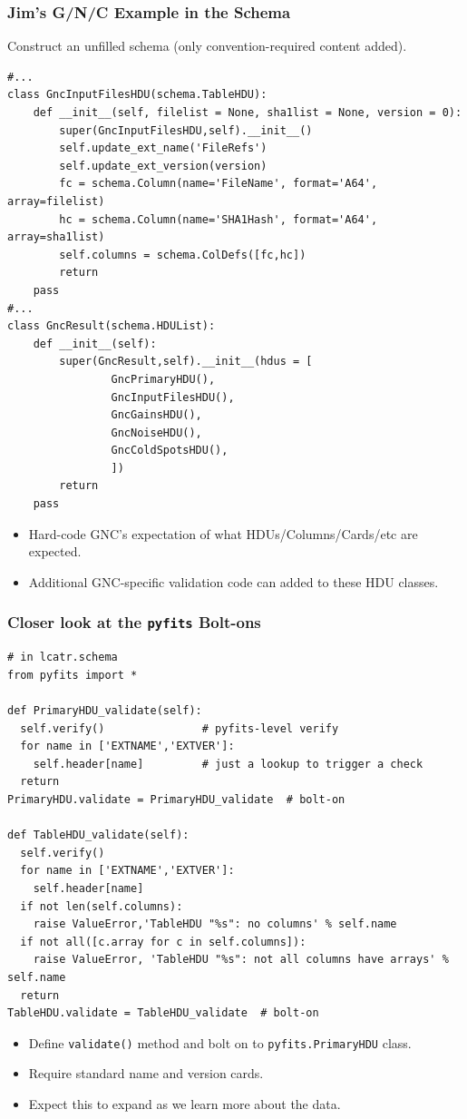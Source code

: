\documentclass[xcolor=dvipsnames]{beamer}
\begin{document}
\begin{frame}[fragile]
  \frametitle{Jim's G/N/C Example in the Schema}

  Construct an unfilled schema (only convention-required content added).

  \begin{lstlisting}[emph={GncInputFilesHDU,GncResult,schema,TableHDU,Column}]
#...
class GncInputFilesHDU(schema.TableHDU):
    def __init__(self, filelist = None, sha1list = None, version = 0):
        super(GncInputFilesHDU,self).__init__()
        self.update_ext_name('FileRefs')
        self.update_ext_version(version)
        fc = schema.Column(name='FileName', format='A64', array=filelist)
        hc = schema.Column(name='SHA1Hash', format='A64', array=sha1list)
        self.columns = schema.ColDefs([fc,hc])
        return
    pass
#...
class GncResult(schema.HDUList):
    def __init__(self):
        super(GncResult,self).__init__(hdus = [
                GncPrimaryHDU(),
                GncInputFilesHDU(),
                GncGainsHDU(),
                GncNoiseHDU(),
                GncColdSpotsHDU(),
                ])
        return
    pass
  \end{lstlisting}
  \footnotesize
  \begin{itemize}
  \item   Hard-code GNC's expectation of what HDUs/Columns/Cards/etc are expected.
  \item   Additional GNC-specific validation code can added to these HDU classes.

  \end{itemize}
\end{frame}

\begin{frame}[fragile]
  \frametitle{Closer look at the \texttt{pyfits} Bolt-ons}

  \begin{lstlisting}[emph={PrimaryHDU_validate,TableHDU_validate,PrimaryHDU,TableHDU,validate}]
# in lcatr.schema
from pyfits import *

def PrimaryHDU_validate(self):
  self.verify()               # pyfits-level verify
  for name in ['EXTNAME','EXTVER']: 
    self.header[name]         # just a lookup to trigger a check
  return
PrimaryHDU.validate = PrimaryHDU_validate  # bolt-on

def TableHDU_validate(self):
  self.verify()
  for name in ['EXTNAME','EXTVER']: 
    self.header[name]
  if not len(self.columns):
    raise ValueError,'TableHDU "%s": no columns' % self.name
  if not all([c.array for c in self.columns]):
    raise ValueError, 'TableHDU "%s": not all columns have arrays' % self.name
  return
TableHDU.validate = TableHDU_validate  # bolt-on
  \end{lstlisting}
  \begin{itemize}
  \item Define \texttt{validate()} method and bolt on to \texttt{pyfits.PrimaryHDU} class.
  \item Require standard name and version cards.
  \item Expect this to expand as we learn more about the data.
  \end{itemize}
\end{frame}
\end{document}
